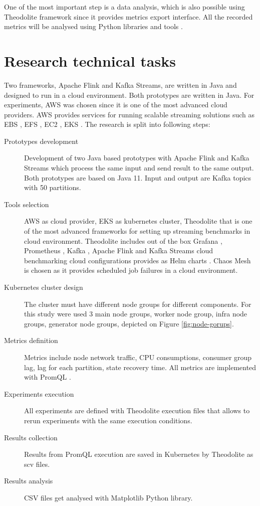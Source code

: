 One of the most important step is a data analysis, which is also possible using Theodolite framework
since it provides metrics export interface.
All the recorded metrics will be analysed using Python libraries and tools
\cite{hightower2019kubernetes} \cite{pivotto2023prometheus} \cite{theodolite_framework}.


\section{Research technical tasks}\label{sec:research-objectives}
Two frameworks, Apache Flink and Kafka Streams, are written in Java and designed to run in a cloud environment.
Both prototypes are written in Java.
For experiments,  AWS was chosen since it is one of the most advanced cloud providers.
AWS provides services for running scalable streaming solutions such as EBS \cite{awsEBS}, EFS \cite{awsEFS}, EC2 \cite{EC2}, EKS \cite{AWSEKS2024}.
The research is split into following steps:

\begin{description}
    \item[Prototypes development] Development of two Java based prototypes with Apache Flink and
    Kafka Streams which process the same input and send result to the same output.
    Both prototypes are based on Java 11.
    Input and output are Kafka topics with 50 partitions.
    \item[Tools selection] AWS as cloud provider, EKS as kubernetes cluster, Theodolite \cite{theodolite_framework}
    \cite{applications_benhcmarks} that is one of the most advanced frameworks for setting up streaming benchmarks
    in cloud environment.
    Theodolite includes out of the box Grafana \cite{Grafana2024}, Prometheus \cite{Prometheus2024} \cite{PrometheusOperator2024}, Kafka \cite{kafka_intro}, Apache Flink and Kafka Streams cloud
    benchmarking cloud configurations provides as Helm charts \cite{helm}.
    Chaos Mesh \cite{chaosMesh} is chosen as it provides scheduled job failures in a cloud environment.
    \item [Kubernetes cluster design] The cluster must have different node groups for different components.
    For this study were used 3 main node groups, worker node group, infra node groups, generator node groups, depicted on Figure \ref{fig:node-gorups}.
    \item[Metrics definition] Metrics include node network traffic, CPU consumptions, consumer group lag,
    lag for each partition, state recovery time.
    All metrics are implemented with PromQL \cite{prometheusQuerying}.
    \item [Experiments execution] All experiments are defined with Theodolite execution files \cite{theodoliteExecution}
    that allows to rerun experiments with the same execution conditions.
    \item[Results collection] Results from PromQL execution are saved in Kubernetes by Theodolite as scv files.
    \item[Results analysis] CSV files get analysed with Matplotlib Python library.
\end{description}

